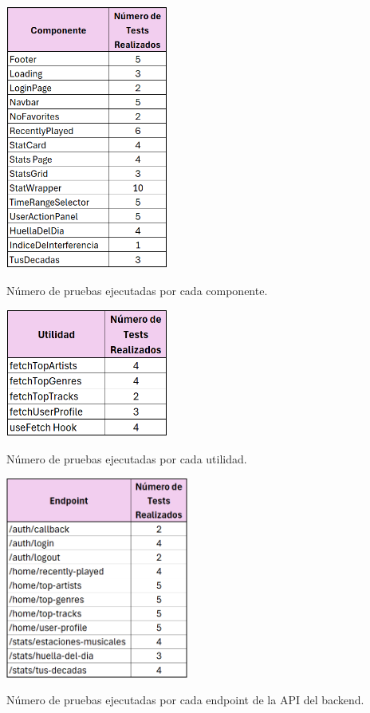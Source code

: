 \begin{table}[H]
    \centering
    \includegraphics[width=0.4\textwidth]{figures/pruebas/numero_test_componentes.png}
    \captionsetup{skip=7pt}
    \caption{Número de pruebas ejecutadas por cada componente.}
    \label{tab:numero_test_componentes}
\end{table}

\begin{table}[H]
    \centering
    \includegraphics[width=0.4\textwidth]{figures/pruebas/numero_test_utilidad.png}
    \captionsetup{skip=7pt}
    \caption{Número de pruebas ejecutadas por cada utilidad.}
    \label{tab:numero_test_utilidad}
\end{table}

\vspace{-0.5cm}

\begin{table}[H]
    \centering
    \includegraphics[width=0.45\textwidth]{figures/pruebas/numero_test_endpoints.png}
    \captionsetup{skip=7pt}
    \caption{Número de pruebas ejecutadas por cada endpoint de la API del backend.}
    \label{tab:numero_test_endpoints}
\end{table}

